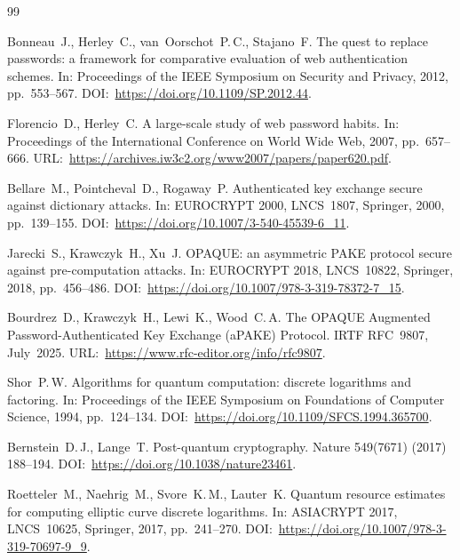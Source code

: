 \documentclass[preprint,12pt]{elsarticle}
\theoremstyle{remark}
\begin{document}
\begin{thebibliography}{99}

Bonneau~J., Herley~C., van~Oorschot~P.\,C., Stajano~F.
The quest to replace passwords: a framework for comparative evaluation of web authentication schemes.
In: Proceedings of the IEEE Symposium on Security and Privacy, 2012, pp.~553--567.
DOI:~\url{https://doi.org/10.1109/SP.2012.44}.

Florencio~D., Herley~C.
A large-scale study of web password habits.
In: Proceedings of the International Conference on World Wide Web, 2007, pp.~657--666.
URL:~\url{https://archives.iw3c2.org/www2007/papers/paper620.pdf}.

Bellare~M., Pointcheval~D., Rogaway~P.
Authenticated key exchange secure against dictionary attacks.
In: EUROCRYPT 2000, LNCS~1807, Springer, 2000, pp.~139--155.
DOI:~\url{https://doi.org/10.1007/3-540-45539-6_11}.

Jarecki~S., Krawczyk~H., Xu~J.
OPAQUE: an asymmetric PAKE protocol secure against pre-computation attacks.
In: EUROCRYPT 2018, LNCS~10822, Springer, 2018, pp.~456--486.
DOI:~\url{https://doi.org/10.1007/978-3-319-78372-7_15}.

Bourdrez~D., Krawczyk~H., Lewi~K., Wood~C.\,A.
The OPAQUE Augmented Password-Authenticated Key Exchange (aPAKE) Protocol.
IRTF RFC~9807, July~2025.
URL:~\url{https://www.rfc-editor.org/info/rfc9807}.

Shor~P.\,W.
Algorithms for quantum computation: discrete logarithms and factoring.
In: Proceedings of the IEEE Symposium on Foundations of Computer Science, 1994, pp.~124--134.
DOI:~\url{https://doi.org/10.1109/SFCS.1994.365700}.

Bernstein~D.\,J., Lange~T.
Post-quantum cryptography.
Nature 549(7671) (2017) 188--194.
DOI:~\url{https://doi.org/10.1038/nature23461}.

Roetteler~M., Naehrig~M., Svore~K.\,M., Lauter~K.
Quantum resource estimates for computing elliptic curve discrete logarithms.
In: ASIACRYPT 2017, LNCS~10625, Springer, 2017, pp.~241--270.
DOI:~\url{https://doi.org/10.1007/978-3-319-70697-9_9}.


\end{thebibliography}
\end{document}
